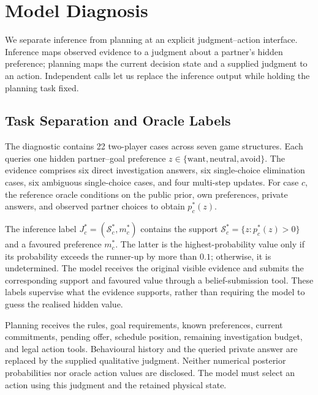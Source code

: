 \documentclass[11pt,a4paper]{article}
\begin{document}
\section{Model Diagnosis}
\label{sec:diagnosis}
We separate inference from planning at an explicit judgment--action
interface. Inference maps observed evidence to a judgment about a partner's
hidden preference; planning maps the current decision state and a supplied
judgment to an action. Independent calls let us replace the inference
output while holding the planning task fixed.

\subsection{Task Separation and Oracle Labels}
The diagnostic contains 22 two-player cases across seven game structures.
Each queries one hidden partner--goal preference
$z\in\{\mathrm{want},\mathrm{neutral},\mathrm{avoid}\}$. The evidence
comprises six direct investigation answers, six single-choice elimination
cases, six ambiguous single-choice cases, and four multi-step updates.
For case $c$, the reference oracle conditions on the public prior, own
preferences, private answers, and observed partner choices to obtain
$p_c^*(z)$.

The inference label $J_c^*=(\mathcal S_c^*,m_c^*)$ contains the support
$\mathcal S_c^*=\{z:p_c^*(z)>0\}$ and a favoured preference $m_c^*$.
The latter is the highest-probability value only if its probability exceeds
the runner-up by more than $0.1$; otherwise, it is undetermined. The model
receives the original visible evidence and submits the corresponding
support and favoured value through a belief-submission tool. These labels
supervise what the evidence supports, rather than requiring the model to
guess the realised hidden value.

Planning receives the rules, goal requirements, known preferences, current
commitments, pending offer, schedule position, remaining investigation
budget, and legal action tools. Behavioural history and the queried
private answer are replaced by the supplied qualitative judgment. Neither
numerical posterior probabilities nor oracle action values are disclosed.
The model must select an action using this judgment and the retained
physical state.
\end{document}
